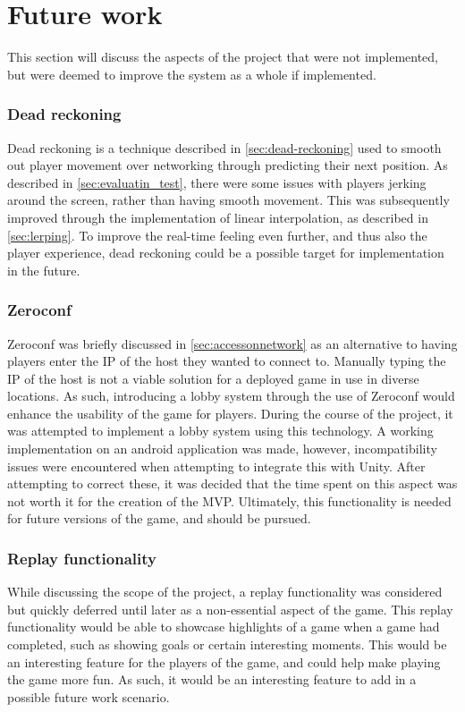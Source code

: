 \section{Future work}\label{discuss:futurework}
This section will discuss the aspects of the project that were not implemented, but were deemed to improve the system as a whole if implemented.

\subsubsection{Dead reckoning}
Dead reckoning is a technique described in \autoref{sec:dead-reckoning} used to smooth out player movement over networking through predicting their next position.
As described in \autoref{sec:evaluatin_test}, there were some issues with players jerking around the screen, rather than having smooth movement.
This was subsequently improved through the implementation of linear interpolation, as described in \autoref{sec:lerping}.
To improve the real-time feeling even further, and thus also the player experience, dead reckoning could be a possible target for implementation in the future.

\subsubsection{Zeroconf}
Zeroconf was briefly discussed in \autoref{sec:accessonnetwork} as an alternative to having players enter the IP of the host they wanted to connect to.
Manually typing the IP of the host is not a viable solution for a deployed game in use in diverse locations.
As such, introducing a lobby system through the use of Zeroconf would enhance the usability of the game for players.
During the course of the project, it was attempted to implement a lobby system using this technology.
A working implementation on an android application was made, however, incompatibility issues were encountered when attempting to integrate this with Unity.
After attempting to correct these, it was decided that the time spent on this aspect was not worth it for the creation of the MVP.
Ultimately, this functionality is needed for future versions of the game, and should be pursued.

\subsubsection{Replay functionality}
While discussing the scope of the project, a replay functionality was considered but quickly deferred until later as a non-essential aspect of the game.
This replay functionality would be able to showcase highlights of a game when a game had completed, such as showing goals or certain interesting moments.
This would be an interesting feature for the players of the game, and could help make playing the game more fun.
As such, it would be an interesting feature to add in a possible future work scenario.

